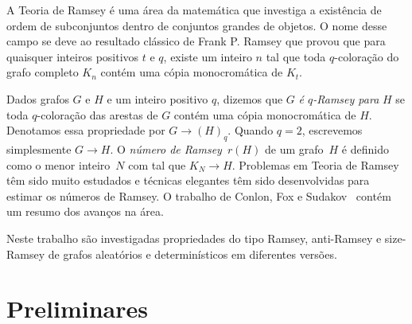 \documentclass[12pt,a4paper]{book}
\begin{document}
A Teoria de Ramsey é uma área da matemática que investiga a existência de ordem de subconjuntos dentro de conjuntos grandes de objetos.
O nome desse campo se deve ao resultado clássico de Frank P. Ramsey \cite{Ra} que provou que para quaisquer inteiros positivos $t$ e $q$, existe um inteiro $n$ tal que toda $q$-coloração do grafo completo $K_n$ contém uma cópia monocromática de $K_t$.


Dados grafos $G$ e $H$ e um inteiro positivo $q$, dizemos que $G$
\emph{é $q$-Ramsey para} $H$ se toda $q$-coloração das arestas de $G$ contém uma cópia monocromática de $H$.
Denotamos essa propriedade por $G\rightarrow (H)_q$.
Quando $q=2$, escrevemos simplesmente $G\rightarrow H$.
O \emph{número de Ramsey}~$r(H)$ de um grafo~$H$ é definido como o menor inteiro~$N$ com tal que $K_N \rightarrow H$.
Problemas em Teoria de Ramsey têm sido muito estudados e técnicas elegantes têm sido desenvolvidas  para estimar os números de Ramsey.
O trabalho de Conlon, Fox e Sudakov~\cite{CoFoSu15} contém um resumo  dos avanços na área.



Neste trabalho 
são investigadas propriedades do tipo Ramsey, anti-Ramsey
e size-Ramsey de grafos aleatórios e determinísticos em diferentes versões. 
\section{Preliminares}
\end{document}
